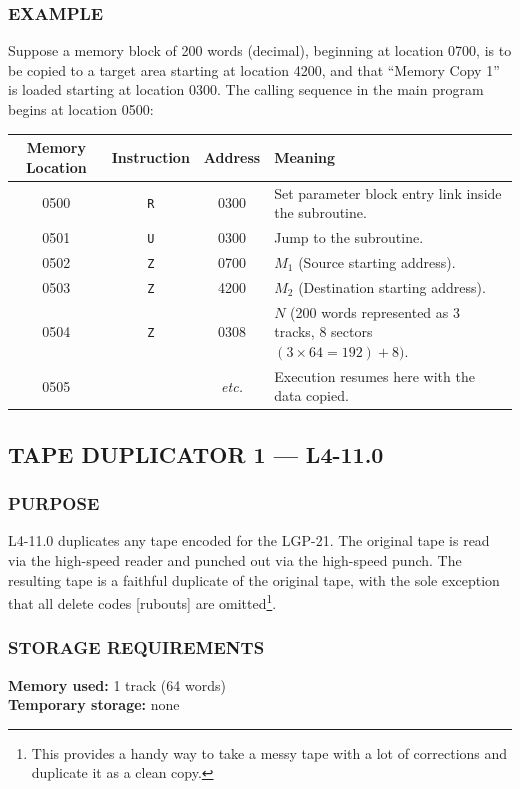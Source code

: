 \subsubsection*{EXAMPLE}
Suppose a memory block of 200 words (decimal), beginning at location 0700, is to be copied to a target area starting at location 4200, and that  ``Memory Copy 1'' is loaded starting at location 0300. The calling sequence in the main program begins at location 0500:

\begin{table}[h!]
\centering
\begin{tabularx}{\textwidth}{cccX}
\toprule
\textbf{Memory Location} & \textbf{Instruction} & \textbf{Address} & \textbf{Meaning} \\
\midrule
0500 & \texttt{R} & 0300 & Set parameter block entry link inside the subroutine. \\
0501 & \texttt{U} & 0300 & Jump to the subroutine. \\
0502 & \texttt{Z} & 0700 & $M_1$ (Source starting address). \\
0503 & \texttt{Z} & 4200 & $M_2$ (Destination starting address). \\
0504 & \texttt{Z} & 0308 & $N$ (200 words represented as 3 tracks, 8 sectors $(3 \times 64 = 192)+ 8)$. \\
0505 &            & \textit{etc.} & Execution resumes here with the data copied. \\
\bottomrule
\end{tabularx}
\end{table}
\subsection*{TAPE DUPLICATOR 1 --- L4-11.0}

\subsubsection*{PURPOSE}
L4-11.0 duplicates any tape encoded for the LGP-21. The original tape is read via the high-speed reader and punched out via the high-speed punch. The resulting tape is a faithful duplicate of the original tape, with the sole exception that all delete codes [rubouts] are omitted\footnote{This provides a handy way to take a messy tape with a lot of corrections and duplicate it as a clean copy.}.

\subsubsection*{STORAGE REQUIREMENTS}
\textbf{Memory used:} 1 track (64 words) \\
\textbf{Temporary storage:} none

